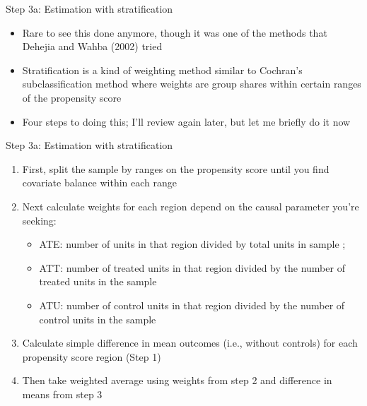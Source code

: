 \documentclass{beamer}
\begin{document}
\begin{frame}{Step 3a: Estimation with stratification}

\begin{itemize}
	
	\item Rare to see this done anymore, though it was one of the methods that Dehejia and Wahba (2002) tried
	\item Stratification is a kind of weighting method similar to Cochran's subclassification method where weights are group shares within certain ranges of the propensity score
	\item Four steps to doing this; I'll review again later, but let me briefly do it now
	
\end{itemize}

\end{frame}


\begin{frame}{Step 3a: Estimation with stratification}

\begin{enumerate}
	\item First, split the sample by ranges on the propensity score until you find covariate balance within each range
	\item Next calculate weights for each region depend on the causal parameter you're seeking:
		\begin{itemize}
		\item ATE: number of units in that region divided by total units in sample ;
		\item ATT: number of treated units in that region divided by the number of treated units in the sample
		\item ATU: number of control units in that region divided by the number of control units in the sample
		\end{itemize}
	\item Calculate simple difference in mean outcomes (i.e., without controls) for each propensity score region (Step 1)
	\item Then take weighted average using weights from step 2 and difference in means from step 3
\end{enumerate}

\end{frame}
\end{document}
